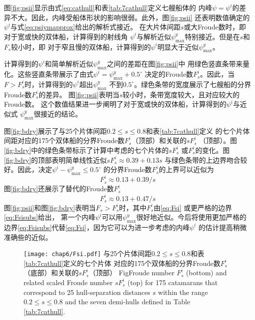 图\ref{fig:psii}显示由式\eqref{eq:cathull}和表\ref{tab:7cathull}定义七艘船体的
内峰$\psi=\psi^i$的差异不大。因此，内峰受船体形状的影响很弱。此外，图\ref{fig:psii}
还表明数值确定的$\psi^i$与式\eqref{eq:psiymapprox}给出的解析式接近。
在大片体间距$s$或大Froude数时，即对于宽或快的双体船，计算得到的射线角
$\psi^i$与解析近似$\psi^y_{\max}$特别接近。但是在$s$和$F_s$较小时，即
对于窄且慢的双体船，计算得到的$\psi^i$明显大于近似$\psi^y_{\max}$。

计算得到的$\psi^i$和简单解析近似$\psi^y_{\max}$之间的差距在图\ref{fig:psii}中
用绿色竖直条带来量化。这些竖直条带展示了由式$\psi^i=\psi^y_{\max}+0.5^\circ$
决定的Froude数$F_s^i$。因此，当$F>F_s^i$时，计算得到的$\psi^i$超出$\psi^y_{\max}$
不到$0.5^\circ$。绿色条带的宽度展示了七艘船的分界Froude数$F_s^i$的差异。
图\ref{fig:psii}表明当$s$较小时，条带宽度较大，且对应较大的Froude数。
这个数值结果进一步阐明了对于宽或快的双体船，计算得到的$\psi^i$与近似式
$\psi^y_{\max}$很接近的结论。


图\ref{fig:bdry}展示了与25个片体间距$0.2\le s\le 0.8$和表\ref{tab:7cathull}定义
的七个片体间距对应的175个双体船的分界Froude数$F^i_s$（顶部）和关联的$sF_s^i$
（顶部）。图\ref{fig:bdry}中的绿色条带标示了计算中考虑的七个片体的$sF_s^i$
或$F_s^i$的变化。图\ref{fig:bdry}的顶部表明简单线性近似$sF_s^i\approx0.39+0.13s$
与绿色条带的上边界吻合较好。因此，决定$\psi^i-\psi^y_{\max}\le0.5^\circ$
的分界Froude数$F_s^i$的上界可以近似为
\begin{equation}
  F_s^i\approx0.13+0.39/s
  \label{eq:Fsi}
\end{equation}
图\ref{fig:bdry}还展示了替代的Froude数$F_s^i$
\begin{equation}
  F_s^i\approx0.13+0.47/s
  \label{eq:Fsisubs}
\end{equation}
图\ref{fig:psii}和图\ref{fig:bdry}表明当$F_s>F_s^i$时，其中$F_s^i$由\eqref{eq:Fsi}
或更严格的边界\eqref{eq:Fsisubs}给出，
第一个内峰$\psi^i$可以用$\psi^y_{\max}$很好地近似。今后将使用更加严格的
边界\eqref{eq:Fsisubs}代替\eqref{eq:Fsi}，因为它可以为进一步考虑的内峰$\psi^i$
的估计提高稍微准确些的近似。
\begin{figure}[htp]
  \centering
  \captionstyle{\centering}
    \texttt{[image: chap6/Fsi.pdf]}
    {与25个片体间距$0.2\le s\le 0.8$和表\ref{tab:7cathull}定义的七个片体
  对应的175个双体船的分界Froude数$F_s^i$（底部）和关联的$sF_s^i$（顶部）}
  {Fig}{Froude number $F^i_s$ (bottom) and related scaled Froude number $sF^i_s$ 
    (top) for 175 catamarans that correspond to 25 hull-separation distances $s$
    within the range $0.2 \le s \le 0.8$ and the seven demi-hulls defined 
    in Table \ref{tab:7cathull}.}
\end{figure}



